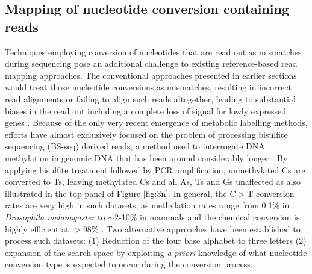 \clearpage

\subsection{Mapping of nucleotide conversion containing reads}

Techniques employing conversion of nucleotides that are read out as mismatches during sequencing pose an additional challenge to existing reference-based read mapping approaches. The conventional approaches presented in earlier sections would treat those nucleotide conversions as mismatches, resulting in incorrect read alignments or failing to align such reads altogether, leading to substantial biases in the read out including a complete loss of signal for lowly expressed genes \citep{Zhang2021}. Because of the only very recent emergence of metabolic labelling methods, efforts have almost exclusively focused on the problem of processing bisulfite sequencing (BS-seq) derived reads, a method used to interrogate DNA methylation in genomic DNA that has been around considerably longer \citep{Frommer1992}. By applying bisulfite treatment followed by PCR amplification, unmethylated Cs are converted to Ts, leaving methylated Cs and all As, Ts and Gs unaffected as also illustrated in the top panel of Figure \ref{fig:3n}. In general, the C$>$T conversion rates are very high in such datasets, as methylation rates range from 0.1\% in \textit{Drosophila melanogaster} to $\sim$2-10\% in mammals \citep{Katoh2006} and the chemical conversion is highly efficient at $>$98\% \citep{Edelheit2013}. Two alternative approaches have been established to process such datasets: (1) Reduction of the four base alphabet to three letters (2) expansion of the search space by exploiting \textit{a priori} knowledge of what nucleotide conversion type is expected to occur during the conversion process.

